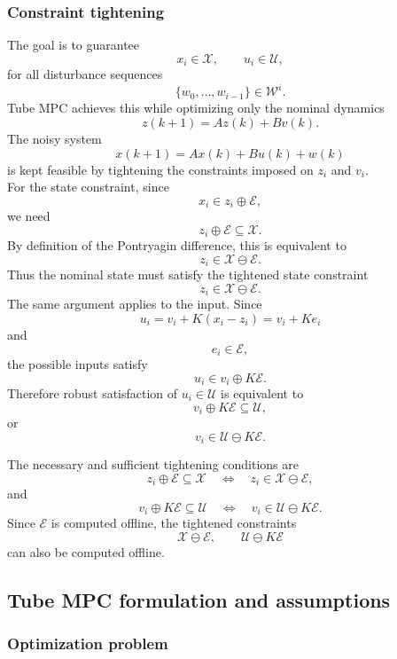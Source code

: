 \subsubsection{Constraint tightening}

The goal is to guarantee
\[
    x_i\in\mathcal X,
    \qquad
    u_i\in\mathcal U,
\]
for all disturbance sequences
\[
    \{w_0,\ldots,w_{i-1}\}\in\mathcal W^i.
\]
Tube MPC achieves this while optimizing only the nominal dynamics
\[
    z(k+1)=Az(k)+Bv(k).
\]
The noisy system
\[
    x(k+1)=Ax(k)+Bu(k)+w(k)
\]
is kept feasible by tightening the constraints imposed on \(z_i\) and \(v_i\).\\

For the state constraint, since
\[
    x_i\in z_i\oplus\mathcal E,
\]
we need
\[
    z_i\oplus\mathcal E\subseteq\mathcal X.
\]
By definition of the Pontryagin difference, this is equivalent to
\[
    z_i\in\mathcal X\ominus\mathcal E.
\]
Thus the nominal state must satisfy the tightened state constraint
\[
    z_i\in\mathcal X\ominus\mathcal E.
\]
The same argument applies to the input. Since
\[
    u_i=v_i+K(x_i-z_i)=v_i+Ke_i
\]
and
\[
    e_i\in\mathcal E,
\]
the possible inputs satisfy
\[
    u_i\in v_i\oplus K\mathcal E.
\]
Therefore robust satisfaction of \(u_i\in\mathcal U\) is equivalent to
\[
    v_i\oplus K\mathcal E\subseteq\mathcal U,
\]
or
\[
    v_i\in\mathcal U\ominus K\mathcal E.
\]

\begin{theorembox}
The necessary and sufficient tightening conditions are
\[
    z_i\oplus\mathcal E\subseteq\mathcal X
    \quad\Longleftrightarrow\quad
    z_i\in\mathcal X\ominus\mathcal E,
\]
and
\[
    v_i\oplus K\mathcal E\subseteq\mathcal U
    \quad\Longleftrightarrow\quad
    v_i\in\mathcal U\ominus K\mathcal E.
\]
Since \(\mathcal E\) is computed offline, the tightened constraints
\[
    \mathcal X\ominus\mathcal E,
    \qquad
    \mathcal U\ominus K\mathcal E
\]
can also be computed offline.
\end{theorembox}

\subsection{Tube MPC formulation and assumptions}

\subsubsection{Optimization problem}

